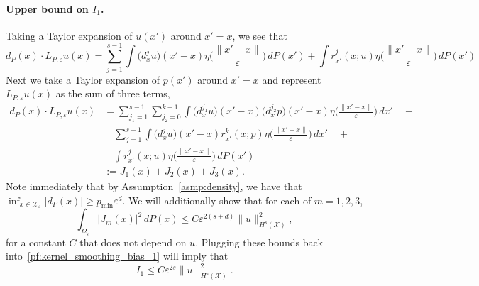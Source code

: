 \documentclass{article}
\newcommand{\1}{\mathbf{1}}
\newcommand{\mc}[1]{\mathcal{#1}}
\theoremstyle{definition}
\theoremstyle{remark}
\begin{document}
\paragraph{Upper bound on $I_1$.}
Taking a Taylor expansion of $u(x')$ around $x' = x$, we see that
\begin{equation*}
d_P(x) \cdot L_{P,\varepsilon}u(x) = \sum_{j = 1}^{s - 1} \int \bigl(d_x^ju\bigr)(x' - x) \eta\biggl(\frac{\|x' - x\|}{\varepsilon}\biggr) \,dP(x') + \int r_{x'}^j(x;u) \eta\biggl(\frac{\|x' - x\|}{\varepsilon}\biggr) \,dP(x')
\end{equation*}
Next we take a Taylor expansion of $p(x')$ around $x' = x$ and represent $L_{P,\varepsilon}u(x)$ as the sum of three terms,
\begin{equation}
\label{pf:kernel_smoothing_bias_1}
\begin{aligned}
d_P(x) \cdot L_{P,\varepsilon}u(x) & = \sum_{j_1 = 1}^{s - 1} \sum_{j_2 = 0}^{k - 1} \int \bigl(d_x^{j_1}u\bigr)(x' - x) \bigl(d_x^{j_2}p\bigr)(x' - x) \eta\biggl(\frac{\|x' - x\|}{\varepsilon}\biggr) \,dx' \quad + \\
& \quad \sum_{j = 1}^{s - 1} \int \bigl(d_x^ju\bigr)(x' - x)  r_{x'}^{k}(x;p) \eta\biggl(\frac{\|x' - x\|}{\varepsilon}\biggr) \,dx' \quad  + \\
& \quad \int r_{x'}^j(x;u) \eta\biggl(\frac{\|x' - x\|}{\varepsilon}\biggr) \,dP(x') \\
& := J_1(x) + J_2(x) + J_3(x).
\end{aligned}
\end{equation}
Note immediately that by Assumption~\ref{asmp:density}, we have that $\inf_{x \in \mc{X}_{\varepsilon}}|d_{P}(x)| \geq p_{\min} \varepsilon^d.$ We will additionally show that for each of $m = 1,2,3$, 
\begin{equation*}
\int_{\Omega_{\varepsilon}} |J_m(x)|^2 \,dP(x) \leq C \varepsilon^{2(s + d)} \|u\|_{H^s(\mc{X})}^2,
\end{equation*}
for a constant $C$ that does not depend on $u$. Plugging these bounds back into~\eqref{pf:kernel_smoothing_bias_1} will imply that
\begin{equation*}
I_1 \leq C \varepsilon^{2s} \|u\|_{H^s(\mc{X})}^2.
\end{equation*}
\end{document}
